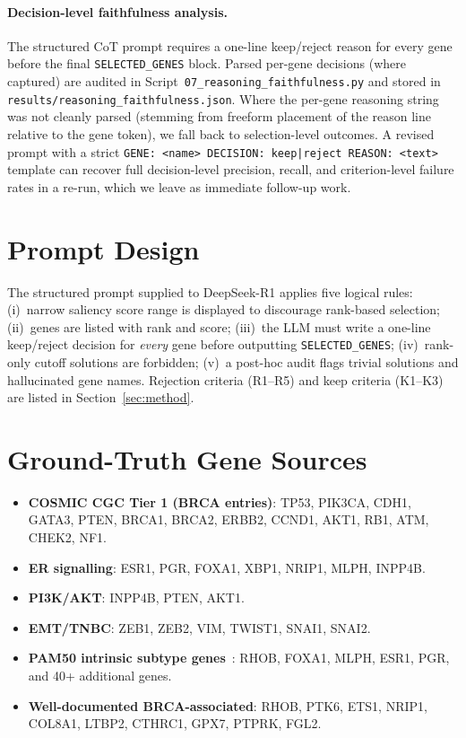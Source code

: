 \documentclass{article}
\begin{document}
\paragraph{Decision-level faithfulness analysis.}
The structured CoT prompt requires a one-line keep/reject reason for every
gene before the final \texttt{SELECTED\_GENES} block.
Parsed per-gene decisions (where captured) are audited in
Script~\texttt{07\_reasoning\_faithfulness.py} and stored in
\texttt{results/reasoning\_faithfulness.json}.
Where the per-gene reasoning string was not cleanly parsed (stemming from
freeform placement of the reason line relative to the gene token),
we fall back to selection-level outcomes.
A revised prompt with a strict \texttt{GENE: <name> DECISION: keep|reject
REASON: <text>} template can recover full decision-level precision,
recall, and criterion-level failure rates in a re-run, which we leave as
immediate follow-up work.

\section{Prompt Design}
\label{app:prompt}

The structured prompt supplied to DeepSeek-R1 applies five logical rules:
(i)~narrow saliency score range is displayed to discourage rank-based
selection; (ii)~genes are listed with rank and score;
(iii)~the LLM must write a one-line keep/reject decision for \emph{every}
gene before outputting \texttt{SELECTED\_GENES};
(iv)~rank-only cutoff solutions are forbidden;
(v)~a post-hoc audit flags trivial solutions and hallucinated gene names.
Rejection criteria (R1--R5) and keep criteria (K1--K3) are listed in
Section~\ref{sec:method}.

\section{Ground-Truth Gene Sources}
\label{app:groundtruth}

\begin{itemize}
  \item \textbf{COSMIC CGC Tier 1 (BRCA entries)}: TP53, PIK3CA, CDH1,
        GATA3, PTEN, BRCA1, BRCA2, ERBB2, CCND1, AKT1, RB1, ATM,
        CHEK2, NF1.
  \item \textbf{ER signalling}: ESR1, PGR, FOXA1, XBP1, NRIP1, MLPH,
        INPP4B.
  \item \textbf{PI3K/AKT}: INPP4B, PTEN, AKT1.
  \item \textbf{EMT/TNBC}: ZEB1, ZEB2, VIM, TWIST1, SNAI1, SNAI2.
  \item \textbf{PAM50 intrinsic subtype genes}~\citep{parker2009}:
        RHOB, FOXA1, MLPH, ESR1, PGR, and 40+ additional genes.
  \item \textbf{Well-documented BRCA-associated}: RHOB, PTK6, ETS1,
        NRIP1, COL8A1, LTBP2, CTHRC1, GPX7, PTPRK, FGL2.
\end{itemize}
\end{document}

